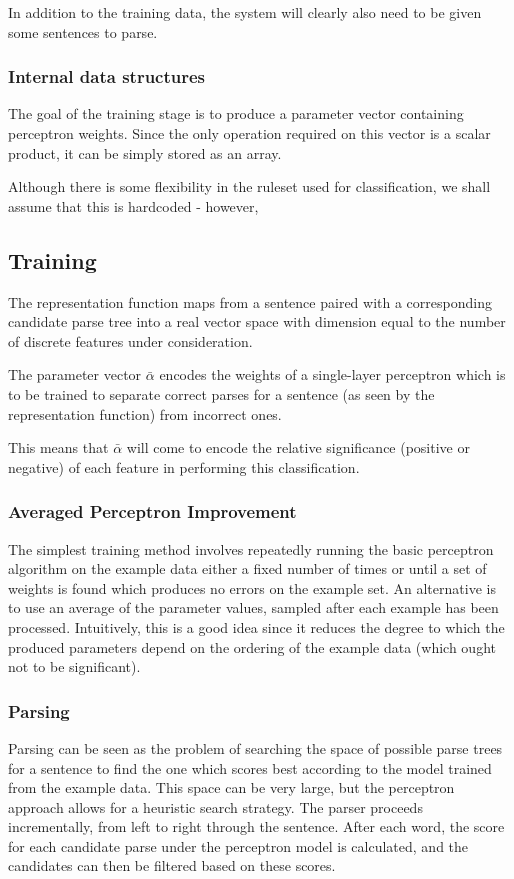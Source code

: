 \documentclass[11pt]{article}
\begin{document}
In addition to the training data, the system will clearly also need to be given
some sentences to parse.

\subsubsection*{Internal data structures}

The goal of the training stage is to produce a parameter vector containing
perceptron weights. Since the only operation required on this vector is a
scalar product, it can be simply stored as an array.

Although there is some flexibility in the ruleset used for classification, we
shall assume that this is hardcoded - however, 

\subsection*{Training}
The representation function maps from a sentence paired with a corresponding
candidate parse tree into a real vector space with dimension equal to the
number of discrete features under consideration.

The parameter vector $\bar{\alpha}$ encodes the weights of a single-layer
perceptron which is to be trained to separate correct parses for a sentence (as
seen by the representation function) from incorrect ones.

This means that $\bar{\alpha}$ will come to encode the relative significance
(positive or negative) of each feature in performing this classification.


\subsubsection*{Averaged Perceptron Improvement}

The simplest training method involves repeatedly running the basic perceptron
algorithm on the example data either a fixed number of times or until a set of
weights is found which produces no errors on the example set.  An alternative
is to use an average of the parameter values, sampled after each example has
been processed. Intuitively, this is a good idea since it reduces the degree to
which the produced parameters depend on the ordering of the example data (which
ought not to be significant).


\subsubsection*{Parsing}
Parsing can be seen as the problem of searching the space of possible parse
trees for a sentence to find the one which scores best according to the model
trained from the example data. This space can be very large, but the perceptron
approach allows for a heuristic search strategy. The parser proceeds
incrementally, from left to right through the sentence. After each word, the
score for each candidate parse under the perceptron model is calculated, and
the candidates can then be filtered based on these scores. 
\end{document}
